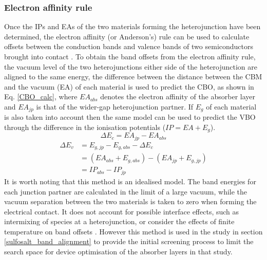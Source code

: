 \documentclass[11pt, twoside]{report}
\begin{document}
\subsubsection{Electron affinity rule}
Once the IPs and EAs of the two materials forming the heterojunction have been determined, the electron affinity (or Anderson's) rule can be used to calculate offsets between the conduction bands and valence bands of two semiconductors brought into contact \cite{Anderson_rule, keith_contacts}.
To obtain the band offsets from the electron affinity rule, the vacuum level of the two heterojunctions either side of the heterojunction are aligned to the same energy, the difference between the distance between the CBM and the vacuum (EA) of each material is used to predict the CBO, as shown in Eq. \ref{CBO_calc}, where $EA_{abs}$ denotes the electron affinity of the absorber layer and $EA_{jp}$ is that of the wider-gap heterojunction partner. If $E_g$ of each material is also taken into account then the same model can be used to predict the VBO through the difference in the ionisation potentials ($IP = EA + E_g$). 
\begin{equation}\label{CBO_calc}
\Delta E_c = EA_{jp} - EA_{abs}
\end{equation}
\begin{equation}\label{VBO_calc}
\begin{aligned}
\Delta E_v & = E_{g,jp} - E_{g,abs} - \Delta E_c \\
& = (EA_{abs }+ E_{g, abs}) - (EA_{jp} + E_{g,jp}) \\
& = IP_{abs} - IP_{jp}
\end{aligned}
\end{equation}
It is worth noting that this method is an idealised model. The band energies for each junction partner are calculated in the limit of a large vacuum, while the vacuum separation between the two materials is taken to zero when forming the electrical contact. It does not account for possible interface effects, such as intermixing of species at a heterojunction, or consider the effects of finite temperature on band offsets \cite{Bartomeu_T_effects}. However this method is used in the study in section \ref{sulfosalt_band_alignment} to provide the initial screening process to limit the search space for device optimisation of the absorber layers in that study.
\end{document}
